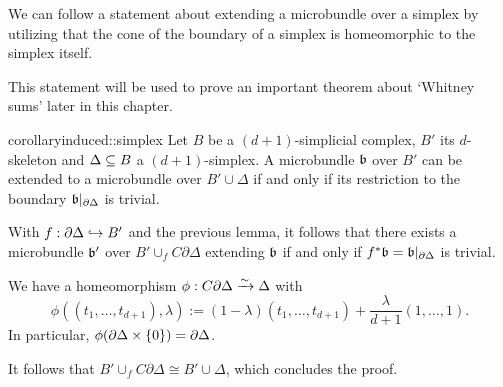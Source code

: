 \begin{myparagraph}
    We can follow a statement about extending a microbundle over a simplex
    by utilizing that the cone of the boundary of a simplex 
    is homeomorphic to the simplex itself.

    This statement will be used to prove an
    important theorem about `Whitney sums' later in this chapter.
\end{myparagraph}

\begin{mystatement}{corollary}{induced::simplex}
    Let $B$ be a $(d + 1)$-simplicial complex, $B'$ its $d$-skeleton and $\Delta \subseteq{} B$ a $(d + 1)$-simplex.
    A microbundle $\bb$ over $B'$ can be extended to a microbundle over $B' \cup \Delta$
    if and only if its restriction to the boundary $\bb[\partial \Delta]$ is trivial.
\end{mystatement}

\begin{myproof}
    With $f: \partial \Delta \hookrightarrow{} B'$ and the previous lemma,
    it follows that there exists a microbundle $\bb'$ over $B' \cup_f C\partial\Delta$ extending $\bb$
    if and only if $\ind{f}\bb = \bb[\partial\Delta]$ is trivial.

    We have a homeomorphism $\phi: C\partial \Delta \xrightarrow{\sim} \Delta$ with
    \[ \phi((t_1, \dots, t_{d + 1}), \lambda) := (1 - \lambda) (t_1, \dots, t_{d + 1}) + \frac{\lambda}{d + 1} (1, \dots, 1). \]
    In particular, $\phi(\partial \Delta \times \{0\}) = \partial \Delta$.

    It follows that $B' \cup_f C \partial\Delta \cong B' \cup \Delta$, which concludes the proof.
\end{myproof}